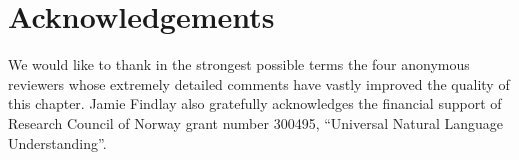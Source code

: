 \documentclass[output=paper]{langscibook}
\begin{document}




\section*{Acknowledgements}
We would like to thank in the strongest possible terms the four anonymous
reviewers whose extremely detailed comments have vastly improved the quality of
this chapter. Jamie Findlay also gratefully acknowledges the financial support
of Research Council of Norway grant number 300495, ``Universal Natural Language
Understanding''.


\printbibliography[heading=subbibliography,notkeyword=this]
\end{document}
